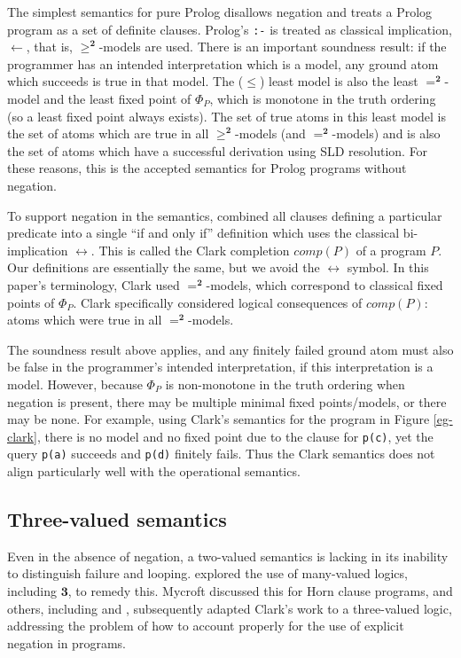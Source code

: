 \documentclass{tlp}
\newcommand{\Bi}{\ensuremath{\mathbf{2}}}
\newcommand{\Tri}{\ensuremath{\mathbf{3}}}
\begin{document}
The simplest semantics for pure Prolog disallows negation and treats a
Prolog program as a set of definite clauses.  Prolog's \texttt{:-} is
treated as classical implication, $\leftarrow$, that is, $\ge^\Bi$-models
are used.  There is an important soundness result: if the programmer
has an intended interpretation which is a model, any ground atom which
succeeds is true in that model.  The ($\le$) least model is also the
least $=^\Bi$-model and the least fixed point of $\Phi_P$, which is
monotone in the truth ordering (so a least fixed point always exists).
The set of true atoms in this least model is the set of atoms which are
true in all $\ge^\Bi$-models (and $=^\Bi$-models) and is also the set of
atoms which have a successful derivation using SLD resolution. 
For these reasons, this is the accepted
semantics for Prolog programs without negation.

To support negation in the semantics,  combined all
clauses defining a particular predicate into a single ``if and only if''
definition which uses the classical bi-implication $\leftrightarrow$.
This is called the Clark completion $comp(P)$ of a program $P$.  
Our definitions
are essentially the same, but we avoid the $\leftrightarrow$ symbol.
In this paper's terminology,
Clark used $=^\Bi$-models, which correspond to classical fixed points 
of $\Phi_P$.  Clark specifically considered logical consequences
of $comp(P)$: atoms which were true in all $=^\Bi$-models.

The soundness result above applies, and any finitely failed ground atom
must also be false in the programmer's intended interpretation, if 
this interpretation is a model.  
However, because $\Phi_P$ is non-monotone in the
truth ordering when negation is present, there may be multiple minimal
fixed points/models, or there may be none.  For example, using Clark's
semantics for the program in Figure \ref{eg-clark}, there is no model
and no fixed point due to the clause for \texttt{p(c)}, yet the query
\texttt{p(a)} succeeds and \texttt{p(d)} finitely fails.  Thus the Clark
semantics does not align particularly well with the operational semantics.


\subsection{Three-valued semantics}
\label{sec-fitting-kunen}

Even in the absence of negation, a two-valued semantics is lacking in
its inability to distinguish failure and looping.
 explored the use of many-valued logics,
including \Tri, to remedy this.
Mycroft discussed this for Horn clause programs, and
others, including  and ,
subsequently adapted Clark's work to a three-valued logic, 
addressing the problem of how to account properly for the use of
explicit negation in programs.
\end{document}
